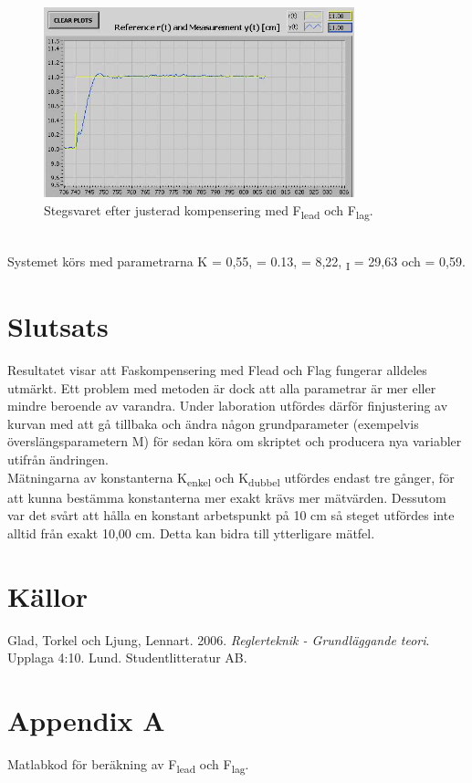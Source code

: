 \documentclass{article}
\begin{document}
\begin{figure}[ht!]
\centering
\includegraphics[width=90mm]{Test3_cut.jpg}
\caption{Stegsvaret efter justerad kompensering med F\textsubscript{lead} och F\textsubscript{lag}.}
\label{overflow}
\end{figure}
~\\
Systemet körs med parametrarna K = 0,55, \textbeta = 0.13,  = 8,22, {\textsubscript{I}} = 29,63 och \textgamma = 0,59. 


\newpage
\section{Slutsats}
Resultatet visar att Faskompensering med Flead och Flag fungerar alldeles utmärkt. Ett problem med metoden är dock att alla parametrar är mer eller mindre beroende av varandra. Under laboration utfördes därför finjustering av kurvan med att gå tillbaka och ändra någon grundparameter (exempelvis överslängsparametern M) för sedan köra om skriptet och producera nya variabler utifrån ändringen.
\\
\newline
Mätningarna av konstanterna K\textsubscript{enkel} och K\textsubscript{dubbel} utfördes endast tre gånger, för att kunna bestämma konstanterna mer exakt krävs mer mätvärden. Dessutom var det svårt att hålla en konstant arbetspunkt på 10 cm så steget utfördes inte alltid från exakt 10,00 cm. Detta kan bidra till ytterligare mätfel.


\newpage


\section{Källor}
Glad, Torkel och Ljung, Lennart. 2006. \textit{Reglerteknik - Grundläggande teori}. Upplaga 4:10. Lund. Studentlitteratur AB.
\newpage


\section{Appendix A}
Matlabkod för beräkning av F\textsubscript{lead} och F\textsubscript{lag}.

\end{document}
